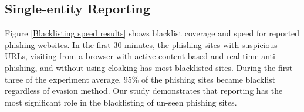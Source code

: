 \subsection{Single-entity Reporting}

Figure \ref{Blacklisting speed results} shows blacklist coverage and speed
for reported phishing websites. In the first 30 minutes, the phishing sites with suspicious URLs, visiting from a browser with active content-based and real-time anti-phishing, and without using cloaking has most blacklisted sites. During the first three of the experiment average, 95\%  of the phishing sites became blacklist regardless of evasion method.
Our study demonstrates that reporting has the most significant role in the blacklisting of un-seen phishing sites.
